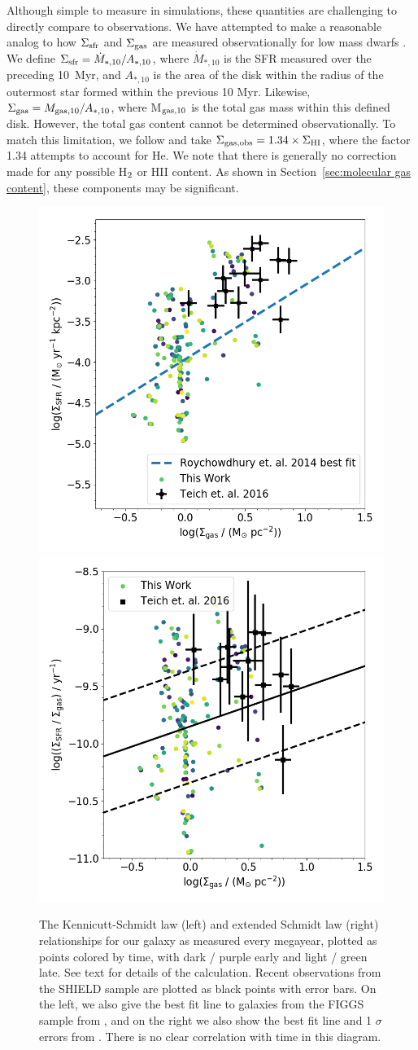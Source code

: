 \documentclass[fleqn,usenatbib,useAMS]{mnras}
\begin{document}
Although simple to measure in simulations, these quantities are challenging to directly compare to observations. We have attempted to make a reasonable analog to how $\Sigma_{\rm sfr}$ and $\Sigma_{\rm gas}$ are measured observationally for low mass dwarfs \citet[see ][]{Roychowdhury2014}. We define $\Sigma_{\rm sfr} = \dot{M}_{*,10} / A_{*,10}$, where $\dot{M}_{*,10}$ is the SFR measured over the preceding 10~Myr, and $A_{*,10}$ is the area of the disk within the radius of the outermost star formed within the previous 10 Myr. Likewise, $\Sigma_{\rm gas} = M_{\rm gas,10} / A_{*,10}$, where M$_{\rm gas,10}$ is the total gas mass within this defined disk. However, the total gas content cannot be determined observationally. To match this limitation, we follow \cite{Roychowdhury2014} and take $\Sigma_{\rm gas, obs} = 1.34 \times \Sigma_{\rm HI}$, where the factor 1.34 attempts to account for He. We note that there is generally no correction made for any possible H$_{\rm 2}$ or HII content. As shown in Section~\ref{sec:molecular gas content}, these components may be significant.

\begin{figure}
\centering
\includegraphics[width=0.475\linewidth]{all_gas_schmidt_law_evolution.png}
\includegraphics[width=0.475\linewidth]{all_gas_efficiency_evolution.png}
\caption{The Kennicutt-Schmidt law (left) and extended Schmidt law (right) relationships for our galaxy as measured every megayear, plotted as points colored by time, with dark / purple early and light / green late. See text for details of the calculation. Recent observations from the SHIELD sample \protect\citep{Teich2016} are plotted as black points with error bars. On the left, we also give the best fit line to galaxies from the FIGGS sample from \protect\cite{Roychowdhury2014}, and on the right we also show the best fit line and 1 $\sigma$ errors from \protect\cite{Shi2011}. There is no clear correlation with time in this diagram.} %
\label{fig:KS}
\end{figure}
\end{document}
